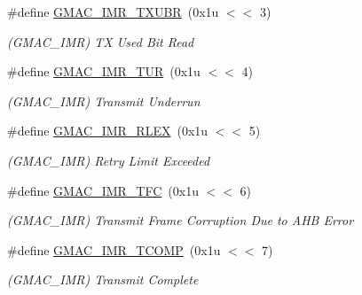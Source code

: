 \begin{DoxyCompactItemize}
\mbox{\label{group__SAMV71__GMAC_ga3784399fa2d8ec98800a377cd6b6c2f5}} 
\#define \mbox{\hyperlink{group__SAMV71__GMAC_ga3784399fa2d8ec98800a377cd6b6c2f5}{G\+M\+A\+C\+\_\+\+I\+M\+R\+\_\+\+T\+X\+U\+BR}}~(0x1u $<$$<$ 3)
\begin{DoxyCompactList}\small\item\em (G\+M\+A\+C\+\_\+\+I\+MR) TX Used Bit Read \end{DoxyCompactList}\item 
\mbox{\label{group__SAMV71__GMAC_ga8ccda744799153a2985379c55e96be16}} 
\#define \mbox{\hyperlink{group__SAMV71__GMAC_ga8ccda744799153a2985379c55e96be16}{G\+M\+A\+C\+\_\+\+I\+M\+R\+\_\+\+T\+UR}}~(0x1u $<$$<$ 4)
\begin{DoxyCompactList}\small\item\em (G\+M\+A\+C\+\_\+\+I\+MR) Transmit Underrun \end{DoxyCompactList}\item 
\mbox{\label{group__SAMV71__GMAC_gac31ce1c4747e9043cffdfde721ec2e08}} 
\#define \mbox{\hyperlink{group__SAMV71__GMAC_gac31ce1c4747e9043cffdfde721ec2e08}{G\+M\+A\+C\+\_\+\+I\+M\+R\+\_\+\+R\+L\+EX}}~(0x1u $<$$<$ 5)
\begin{DoxyCompactList}\small\item\em (G\+M\+A\+C\+\_\+\+I\+MR) Retry Limit Exceeded \end{DoxyCompactList}\item 
\mbox{\label{group__SAMV71__GMAC_ga6dea46fe367a83e1f98da17dc9052ef9}} 
\#define \mbox{\hyperlink{group__SAMV71__GMAC_ga6dea46fe367a83e1f98da17dc9052ef9}{G\+M\+A\+C\+\_\+\+I\+M\+R\+\_\+\+T\+FC}}~(0x1u $<$$<$ 6)
\begin{DoxyCompactList}\small\item\em (G\+M\+A\+C\+\_\+\+I\+MR) Transmit Frame Corruption Due to A\+HB Error \end{DoxyCompactList}\item 
\mbox{\label{group__SAMV71__GMAC_ga8d6355192d70c07da2c8b8986d06234f}} 
\#define \mbox{\hyperlink{group__SAMV71__GMAC_ga8d6355192d70c07da2c8b8986d06234f}{G\+M\+A\+C\+\_\+\+I\+M\+R\+\_\+\+T\+C\+O\+MP}}~(0x1u $<$$<$ 7)
\begin{DoxyCompactList}\small\item\em (G\+M\+A\+C\+\_\+\+I\+MR) Transmit Complete \end{DoxyCompactList}\item 
$$
\end{DoxyCompactItemize}
